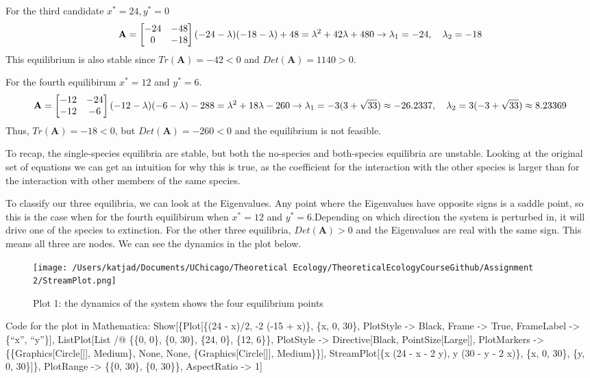 \documentclass[
]{article}
\begin{document}
For the third candidate \(x^*= 24, y^*= 0\) \[
\mathbf{A}= 
\begin{bmatrix}
-24 & -48 \\ 
0 & -18
\end{bmatrix}\\
(-24-\lambda)(-18-\lambda)+48 = \lambda^2+42\lambda+480\\
\rightarrow \lambda_1=-24,\quad \lambda_2=-18
\] This equilibrium is also stable since \(Tr(\mathbf{A})=-42<0\) and
\(Det(\mathbf{A})=1140>0\).

For the fourth equilibirum \(x^*= 12\) and \(y^*= 6\). \[
\mathbf{A}= 
\begin{bmatrix}
-12 & -24 \\ 
-12 & -6
\end{bmatrix}\\
(-12-\lambda)(-6-\lambda)-288 = \lambda^2+18\lambda-260\\
\rightarrow \lambda_1=-3 (3 + \sqrt{33})\approx-26.2337,\quad\lambda_2= 3 (-3 +\sqrt{33})\approx 8.23369
\] Thus, \(Tr(\mathbf{A})=-18<0\), but \(Det(\mathbf{A})=-260<0\) and
the equilibrium is not feasible.

To recap, the single-species equilibria are stable, but both the
no-species and both-species equilibria are unstable. Looking at the
original set of equations we can get an intuition for why this is true,
as the coefficient for the interaction with the other species is larger
than for the interaction with other members of the same species.

To classify our three equilibria, we can look at the Eigenvalues. Any
point where the Eigenvalues have opposite signs is a saddle point, so
this is the case when for the fourth equilibirum when \(x^*= 12\) and
\(y^*= 6\).Depending on which direction the system is perturbed in, it
will drive one of the species to extinction. For the other three
equilibria, \(Det(\mathbf{A})>0\) and the Eigenvalues are real with the
same sign. This means all three are nodes. We can see the dynamics in
the plot below.

\begin{figure}
\centering
\texttt{[image: /Users/katjad/Documents/UChicago/Theoretical Ecology/TheoreticalEcologyCourseGithub/Assignment 2/StreamPlot.png]}
\caption{Plot 1: the dynamics of the system shows the four equilibrium
points}
\end{figure}

Code for the plot in Mathematica: Show{[}\{Plot{[}\{(24 - x)/2, -2 (-15
+ x)\}, \{x, 0, 30\}, PlotStyle -\textgreater{} Black, Frame
-\textgreater{} True, FrameLabel -\textgreater{} \{``x'', ``y''\}{]},
ListPlot{[}List /@ \{\{0, 0\}, \{0, 30\}, \{24, 0\}, \{12, 6\}\},
PlotStyle -\textgreater{} Directive{[}Black, PointSize{[}Large{]}{]},
PlotMarkers -\textgreater{} \{\{Graphics{[}Circle{[}{]}{]}, Medium\},
None, None, \{Graphics{[}Circle{[}{]}{]}, Medium\}\}{]},
StreamPlot{[}\{x (24 - x - 2 y), y (30 - y - 2 x)\}, \{x, 0, 30\}, \{y,
0, 30\}{]}\}, PlotRange -\textgreater{} \{\{0, 30\}, \{0, 30\}\},
AspectRatio -\textgreater{} 1{]}
\end{document}
